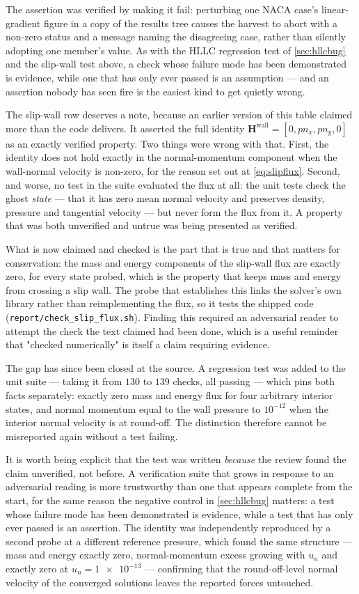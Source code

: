 The assertion was verified by making it fail: perturbing one NACA case's
linear-gradient figure in a copy of the results tree causes the harvest to abort with a
non-zero status and a message naming the disagreeing case, rather than silently adopting
one member's value. As with the HLLC regression test of \cref{sec:hllcbug} and the
slip-wall test above, a check whose failure mode has been demonstrated is evidence, while
one that has only ever passed is an assumption --- and an assertion nobody has seen fire is
the easiest kind to get quietly wrong.

The slip-wall row deserves a note, because an earlier version of this table claimed more
than the code delivers. It asserted the full identity
$\mathbf{H}^{\mathrm{wall}}=[0,pn_x,pn_y,0]$ as an exactly verified property. Two things
were wrong with that. First, the identity does not hold exactly in the normal-momentum
component when the wall-normal velocity is non-zero, for the reason set out at
\cref{eq:slipflux}. Second, and worse, no test in the suite evaluated the flux at all:
the unit tests check the ghost \emph{state} --- that it has zero mean normal velocity and
preserves density, pressure and tangential velocity --- but never form the flux from it.
A property that was both unverified and untrue was being presented as verified.

What is now claimed and checked is the part that is true and that matters for
conservation: the mass and energy components of the slip-wall flux are exactly zero, for
every state probed, which is the property that keeps mass and energy from crossing a
slip wall.
The probe that establishes this links the solver's own library rather than
reimplementing the flux, so it tests the shipped code
(\texttt{report/check\_slip\_flux.sh}). Finding this required an adversarial reader to
attempt the check the text claimed had been done, which is a useful reminder that
"checked numerically" is itself a claim requiring evidence.

The gap has since been closed at the source. A regression test was added to the unit
suite --- taking it from $130$ to $139$ checks, all passing --- which pins both facts
separately: exactly zero mass and energy flux for four arbitrary interior states, and
normal momentum equal to the wall pressure to $10^{-12}$ when the interior normal
velocity is at round-off. The distinction therefore cannot be misreported again without
a test failing.

It is worth being explicit that the test was written \emph{because} the review found the
claim unverified, not before. A verification suite that grows in response to an
adversarial reading is more trustworthy than one that appears complete from the start,
for the same reason the negative control in \cref{sec:hllcbug} matters: a test whose
failure mode has been demonstrated is evidence, while a test that has only ever passed
is an assertion. The identity was independently reproduced by a second probe at a
different reference pressure, which found the same structure --- mass and energy exactly
zero, normal-momentum excess growing with $u_n$ and exactly zero at
$u_n=\num{1e-13}$ --- confirming that the round-off-level normal velocity of the
converged solutions leaves the reported forces untouched.

